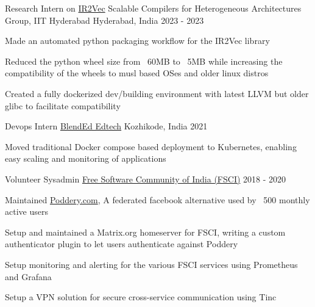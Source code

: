 \begin{cventries}
    
	\cventry
    {Research Intern on \href{https://github.com/IITH-Compilers/IR2Vec}{IR2Vec}} %
    {Scalable Compilers for Heterogeneous Architectures Group, IIT Hyderabad} %
    {Hyderabad, India} %
    {2023 - 2023} %
    {
      \begin{cvitems} %
        \item {Made an automated python packaging workflow for the IR2Vec library}
        \item {Reduced the python wheel size from ~60MB to ~5MB while increasing the compatibility of the wheels to musl based OSes and older linux distros}
        \item {Created a fully dockerized dev/building environment with latest LLVM but older glibc to facilitate compatibility}
      \end{cvitems}
    }
    
    
  \cventry
    {Devops Intern} %
    {\href{https://blend-ed.org/}{BlendEd Edtech}} %
    {Kozhikode, India} %
    {2021} %
    {
      \begin{cvitems} %
        \item {Moved traditional Docker compose based deployment to Kubernetes, enabling easy scaling and monitoring of applications}
      \end{cvitems}
    }
    
    
    \cventry
    {Volunteer Sysadmin} %
    {\href{https://fsci.in}{Free Software Community of India (FSCI)}} %
    {} %
    {2018 - 2020} %
    {
      \begin{cvitems} %
        \item {Maintained \href{https://poddery.com}{Poddery.com}, A federated facebook alternative used by ~500 monthly active users}
        \item {Setup and maintained a Matrix.org homeserver for FSCI, writing a custom authenticator plugin to let users authenticate against Poddery}
        \item {Setup monitoring and alerting for the various FSCI services using Prometheus and Grafana}
        \item {Setup a VPN solution for secure cross-service communication using Tinc}
      \end{cvitems}
    }
\end{cventries}

